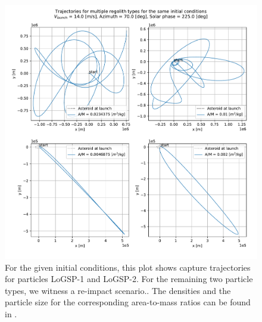 \begin{figure}[htb]
\centering
\captionsetup{justification=centering}
\includegraphics[width=\textwidth, height=0.6\textheight, keepaspectratio=true]{leading_edge_perturbations/capture_reimpact_scenario_14ms_70Azim_225SolarPhase_individualTrajPlots.pdf}
\caption{For the given initial conditions, this plot shows capture trajectories for particles LoGSP-1 and LoGSP-2. For the remaining two particle types, we witness a re-impact scenario.. The densities and the particle size for the corresponding area-to-mass ratios can be found in .}
\label{fig:capture_reimpact_traj_14ms_70Azim_225solarPhase_leadingEdge}
\end{figure}
\FloatBarrier

